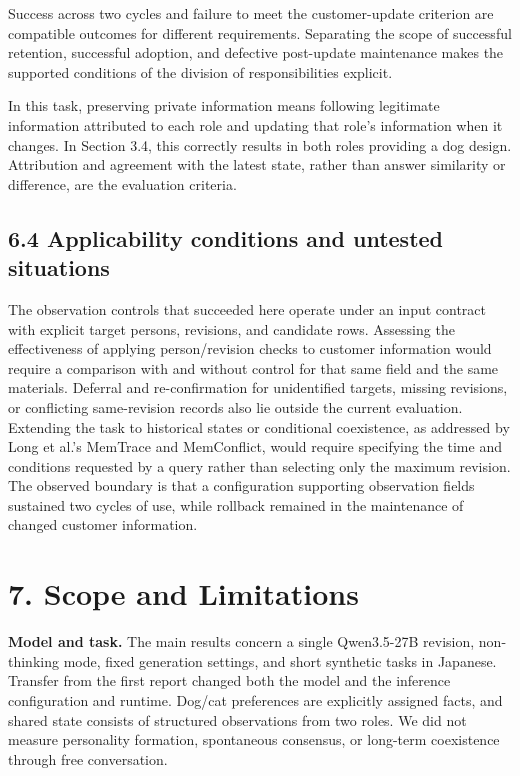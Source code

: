\documentclass[10pt,a4paper]{article}
\begin{document}
Success across two cycles and failure to meet the customer-update criterion are compatible outcomes for different requirements. Separating the scope of successful retention, successful adoption, and defective post-update maintenance makes the supported conditions of the division of responsibilities explicit.

In this task, preserving private information means following legitimate information attributed to each role and updating that role's information when it changes. In Section 3.4, this correctly results in both roles providing a dog design. Attribution and agreement with the latest state, rather than answer similarity or difference, are the evaluation criteria.

\subsection{6.4 Applicability conditions and untested situations}\label{paper-02-applicability-conditions-and-untested-situations}

The observation controls that succeeded here operate under an input contract with explicit target persons, revisions, and candidate rows. Assessing the effectiveness of applying person/revision checks to customer information would require a comparison with and without control for that same field and the same materials. Deferral and re-confirmation for unidentified targets, missing revisions, or conflicting same-revision records also lie outside the current evaluation. Extending the task to historical states or conditional coexistence, as addressed by Long et al.'s MemTrace and MemConflict, would require specifying the time and conditions requested by a query rather than selecting only the maximum revision. The observed boundary is that a configuration supporting observation fields sustained two cycles of use, while rollback remained in the maintenance of changed customer information.

\section{7. Scope and Limitations}\label{paper-02-scope-and-limitations}

\textbf{Model and task.} The main results concern a single Qwen3.5-27B revision, non-thinking mode, fixed generation settings, and short synthetic tasks in Japanese. Transfer from the first report changed both the model and the inference configuration and runtime. Dog/cat preferences are explicitly assigned facts, and shared state consists of structured observations from two roles. We did not measure personality formation, spontaneous consensus, or long-term coexistence through free conversation.
\end{document}
